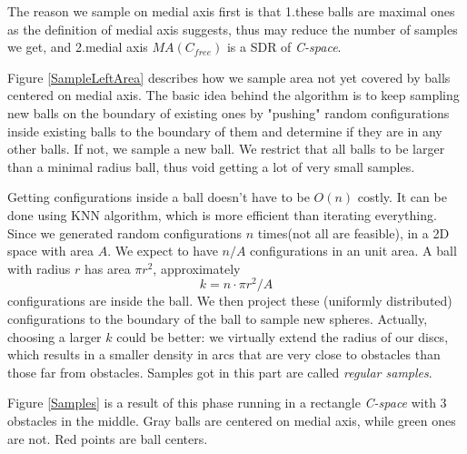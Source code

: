 \documentclass[11pt]{article}
\begin{document}
\indent The reason we sample on medial axis first is that 1.these balls are maximal ones as the definition of medial axis suggests, thus may reduce the number of samples we get, and 2.medial axis $MA(C_{free})$ is a SDR of \emph{C-space}. \cite{MAPRM2}

\indent Figure \ref{SampleLeftArea} describes how we sample area not yet covered by balls centered on medial axis. The basic idea behind the algorithm is to keep sampling new balls on the boundary of existing ones by "pushing" random configurations inside existing balls to the boundary of them and determine if they are in any other balls. If not, we sample a new ball. We restrict that all balls to be larger than a minimal radius ball, thus void getting a lot of very small samples.

\indent Getting configurations inside a ball doesn't have to be $O(n)$ costly. It can be done using KNN algorithm, which is more efficient than iterating everything. Since we generated random configurations $n$ times(not all are feasible), in a 2D space with area $A$. We expect to have $n/A$ configurations in an unit area. A ball with radius $r$ has area $\pi r^2$, approximately
\begin{equation}
k = n \cdot \pi r^2 / A
\end{equation} 
configurations are inside the ball. We then project these (uniformly distributed) configurations to the boundary of the ball to sample new spheres. Actually, choosing a larger $k$ could be better: we virtually extend the radius of our discs, which results in a smaller density in arcs that are very close to obstacles than those far from obstacles. Samples got in this part are called \emph{regular samples}. 

\indent Figure \ref{Samples} is a result of this phase running in a rectangle \emph{C-space} with 3 obstacles in the middle. Gray balls are centered on medial axis, while green ones are not. Red points are ball centers.
\end{document}
